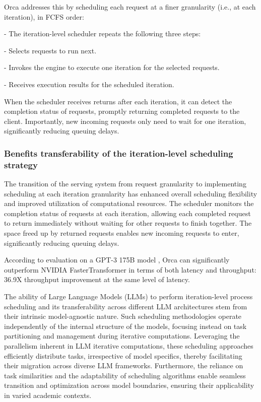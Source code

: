 \documentclass[conference]{IEEEtran}
\begin{document}
Orca addresses this by scheduling each request at a finer granularity (i.e., at each iteration), in FCFS order:

- The iteration-level scheduler repeats the following three steps:

- Selects requests to run next.

- Invokes the engine to execute one iteration for the selected requests.

- Receives execution results for the scheduled iteration.

When the scheduler receives returns after each iteration, it can detect the completion status of requests, promptly returning completed requests to the client. Importantly, new incoming requests only need to wait for one iteration, significantly reducing queuing delays.

\subsubsection{Benefits transferability of the iteration-level scheduling strategy}


The transition of the serving system from request granularity to implementing scheduling at each iteration granularity has enhanced overall scheduling flexibility and improved utilization of computational resources.
The scheduler monitors the completion status of requests at each iteration, allowing each completed request to return immediately without waiting for other requests to finish together. The space freed up by returned requests enables new incoming requests to enter, significantly reducing queuing delays.

According to evaluation on a GPT-3 175B model , Orca can significantly outperform NVIDIA FasterTransformer in terms of both latency and throughput: 36.9X throughput improvement at the same level of latency. \cite{b10}


The ability of Large Language Models (LLMs) to perform iteration-level process scheduling and its transferability across different LLM architectures stem from their intrinsic model-agnostic nature. Such scheduling methodologies operate independently of the internal structure of the models, focusing instead on task partitioning and management during iterative computations. Leveraging the parallelism inherent in LLM iterative computations, these scheduling approaches efficiently distribute tasks, irrespective of model specifics, thereby facilitating their migration across diverse LLM frameworks. Furthermore, the reliance on task similarities and the adaptability of scheduling algorithms enable seamless transition and optimization across model boundaries, ensuring their applicability in varied academic contexts.
\end{document}
